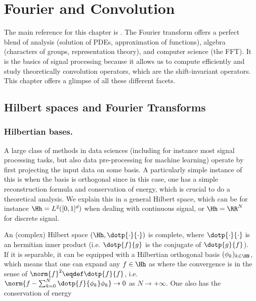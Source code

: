 
\chapter{Fourier and Convolution}
\label{sec-fourier}

The main reference for this chapter is \cite{mallat2008wavelet}.
%
The Fourier transform offers a perfect blend of analysis (solution of PDEs, approximation of functions), algebra (characters of groups, representation theory), and computer science (the FFT). 
%
It is the basics of signal processing because it allows us to compute efficiently and study theoretically convolution operators, which are the shift-invariant operators. 
%
This chapter offers a glimpse of all these different facets. 

\newcommand{\piN}{\frac{2\imath\pi}{N}}

\section{Hilbert spaces and Fourier Transforms}

\subsection{Hilbertian bases.}

A large class of methods in data sciences (including for instance most signal processing tasks, but also data pre-processing for machine learning) operate by first projecting the input data on some basis. A particularly simple instance of this is when the basis is orthogonal since in this case, one has a simple reconstruction formula and conservation of energy, which is crucial to do a theoretical analysis. We explain this in a general Hilbert space, which can be for instance $\Hh = L^2([0,1]^d)$ when dealing with continuous signal, or $\Hh=\RR^N$ for discrete signal.  

An (complex) Hilbert space $(\Hh,\dotp{\cdot}{\cdot})$ is complete, where $\dotp{\cdot}{\cdot}$ is an hermitian inner product (i.e. $\dotp{f}{g}$ is the conjugate of $\dotp{g}{f}$). If it is separable, it can be equipped with a Hilbertian orthogonal basis $(\phi_k)_{k \in \NN}$, which means that one can expand any $f \in \Hh$ as
where the convergence is in the sense of $\norm{f}^2 \eqdef \dotp{f}{f}$, i.e. $\norm{ f - \sum_{k=0}^N \dotp{f}{\phi_k} \phi_k } \rightarrow 0$ as $N \rightarrow +\infty$. One also has the conservation of energy 

